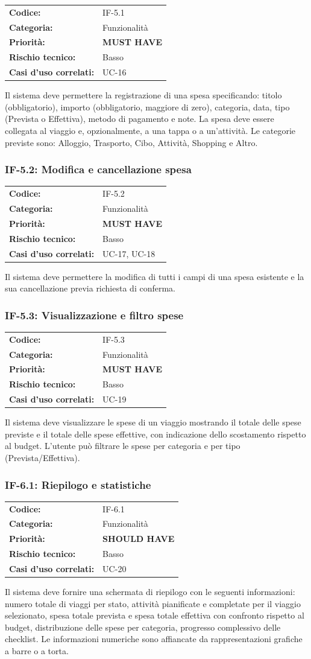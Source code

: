 \documentclass[12pt, a4paper]{article}
\makeatletter
\newcommand{\reqblock}[5]{%
  \begin{tabular}{@{}ll@{}}
    \toprule
    \textbf{Codice:}              & #1 \\
    \textbf{Categoria:}           & #2 \\
    \textbf{Priorità:}            & #3 \\
    \textbf{Rischio tecnico:}     & #4 \\
    \textbf{Casi d'uso correlati:}& #5 \\
    \bottomrule
  \end{tabular}
}
\newcommand{\MUST}{\colorbox{musthave}{\small\textbf{MUST HAVE}}}
\newcommand{\SHOULD}{\colorbox{shouldhave}{\small\textbf{SHOULD HAVE}}}
\newcommand{\RISKL}{\colorbox{risklow}{\small Basso}}
\makeatother
\begin{document}
\medskip
\reqblock{IF-5.1}{Funzionalità}{\MUST}{\RISKL}{UC-16}
\medskip

\noindent
Il sistema deve permettere la registrazione di una spesa specificando: titolo (obbligatorio),
importo (obbligatorio, maggiore di zero), categoria, data, tipo (Prevista o Effettiva),
metodo di pagamento e note. La spesa deve essere collegata al viaggio e, opzionalmente,
a una tappa o a un'attività. Le categorie previste sono: Alloggio, Trasporto, Cibo,
Attività, Shopping e Altro.

\subsubsection{IF-5.2: Modifica e cancellazione spesa}

\medskip
\reqblock{IF-5.2}{Funzionalità}{\MUST}{\RISKL}{UC-17, UC-18}
\medskip

\noindent
Il sistema deve permettere la modifica di tutti i campi di una spesa esistente e la
sua cancellazione previa richiesta di conferma.

\subsubsection{IF-5.3: Visualizzazione e filtro spese}

\medskip
\reqblock{IF-5.3}{Funzionalità}{\MUST}{\RISKL}{UC-19}
\medskip

\noindent
Il sistema deve visualizzare le spese di un viaggio mostrando il totale delle spese
previste e il totale delle spese effettive, con indicazione dello scostamento rispetto
al budget. L'utente può filtrare le spese per categoria e per tipo (Prevista/Effettiva).

\subsubsection{IF-6.1: Riepilogo e statistiche}

\medskip
\reqblock{IF-6.1}{Funzionalità}{\SHOULD}{\RISKL}{UC-20}
\medskip

\noindent
Il sistema deve fornire una schermata di riepilogo con le seguenti informazioni: numero
totale di viaggi per stato, attività pianificate e completate per il viaggio selezionato,
spesa totale prevista e spesa totale effettiva con confronto rispetto al budget, distribuzione
delle spese per categoria, progresso complessivo delle checklist. Le informazioni numeriche
sono affiancate da rappresentazioni grafiche a barre o a torta.
\end{document}
